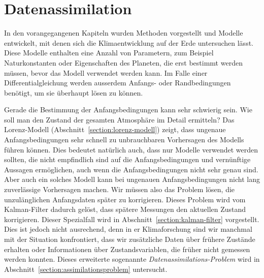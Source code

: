 %
%
%
\chapter{Datenassimilation\label{chapter:assimilation}}
In den vorangegangenen Kapiteln wurden Methoden vorgestellt
und Modelle entwickelt, mit denen sich die Klimaentwicklung auf der
Erde untersuchen lässt.
Diese Modelle enthalten eine Anzahl von Parametern, zum Beispiel
Naturkonstanten oder Eigenschaften des Planeten, die erst bestimmt
werden müssen, bevor das Modell verwendet werden kann.
Im Falle einer Differentialgleichung werden ausserdem Anfangs-
oder Randbedingungen benötigt, um sie überhaupt lösen zu können.

Gerade die Bestimmung der Anfangsbedingungen kann sehr schwierig sein.
Wie soll man den Zustand der gesamten Atmosphäre im Detail ermitteln?
Das Lorenz-Modell (Abschnitt~\ref{section:lorenz-modell}) zeigt, dass
ungenaue Anfangsbedingungen sehr schnell zu unbrauchbaren Vorhersagen
des Modells führen können.
Dies bedeutet natürlich auch, dass nur Modelle verwendet werden sollten,
die nicht empfindlich sind auf die Anfangsbedingungen und vernünftige
Aussagen ermöglichen, auch wenn die Anfangsbedingungen nicht sehr genau 
sind.
Aber auch ein solches Modell kann bei ungenauen Anfangsbedingungen 
nicht lang zuverlässige Vorhersagen machen.
Wir müssen also das Problem lösen, die unzulänglichen Anfangsdaten 
später zu korrigieren.
Dieses Problem wird vom Kalman-Filter dadurch gelöst, dass spätere
Messungen den aktuellen Zustand korrigieren.
Dieser Spezialfall wird in Abschnitt~\ref{section:kalman-filter}
vorgestellt.
Dies ist jedoch nicht ausrechend, denn in er Klimaforschung sind wir
manchmal mit der Situation konfrontiert, dass wir zusätzliche
Daten über frühere Zustände erhalten oder Informationen über Zustandsvariablen,
die früher nicht gemessen werden konnten.
Dieses erweiterte sogenannte {\em Datenassimilations-Problem} wird in
Abschnitt~\ref{section:assimilationsproblem} untersucht.







